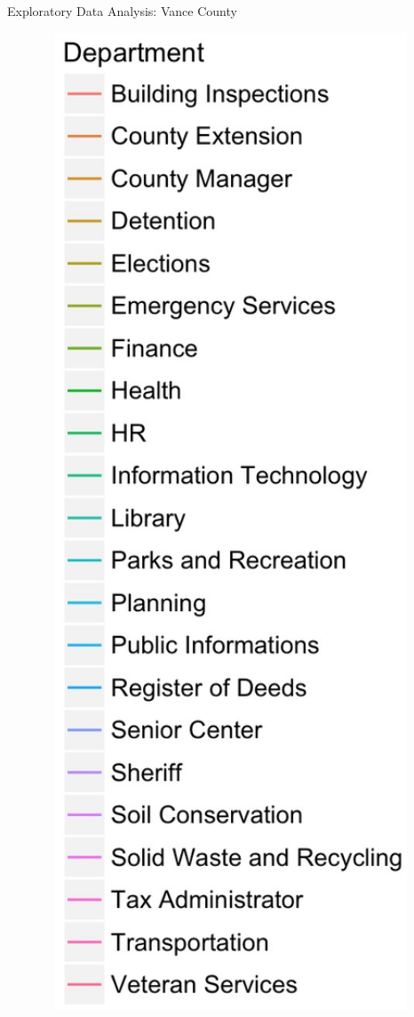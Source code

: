 \documentclass[10pt]{beamer}
\theoremstyle{definition}
\theoremstyle{remark}
\begin{document}
\begin{frame}{Exploratory Data Analysis: Vance County}
\begin{minipage}{0.13\linewidth}
\begin{figure}
	 		 		 	\includegraphics[width=1.25\textwidth]{figures/Dept2.jpg}
	 \end{figure}	
	\end{minipage}
\end{frame}
\end{document}
